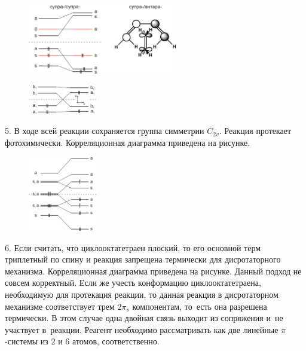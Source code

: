 \vspace{-\parskip}
\vspace{1mm}
\begin{figure}[h]
\includegraphics[width=6.5cm]{images/Fig_2_1_4_dec.png}
\centering
\end{figure}
\vspace{-\parskip}
\par
\begin{figure} %
    \centering
    \vspace{-0.7mm}
    \includegraphics[width=30mm]{images/Fig_2_1_5_dec.png}
    \vspace{-9mm}
\end{figure}
5. В ходе всей реакции сохраняется группа симметрии  $C_{2v}$. Реакция протекает фотохимически. Корреляционная диаграмма приведена на рисунке.\par
\begin{figure} %
    \centering
    \vspace{5.4mm}
    \includegraphics[width=30mm]{images/Fig_2_1_6_dec.png}
    \vspace{-5mm}
\end{figure}
6. Если считать, что циклооктатетраен плоский, то его основной терм триплетный по спину и реакция запрещена термически для дисротаторного механизма. Корреляционная диаграмма приведена на рисунке. Данный подход не совсем корректный. Если же учесть конформацию циклооктатетраена, необходимую для протекация реакции, то данная реакция в дисротаторном механизме соответствует трем $2\pi_s$ компонентам, то~есть она разрешена термически. В этом случае одна двойная связь выходит из сопряжения и~не участвует в~реакции. Реагент необходимо рассматривать как две линейные $\pi$-системы из 2 и 6 атомов, соответственно.\par
